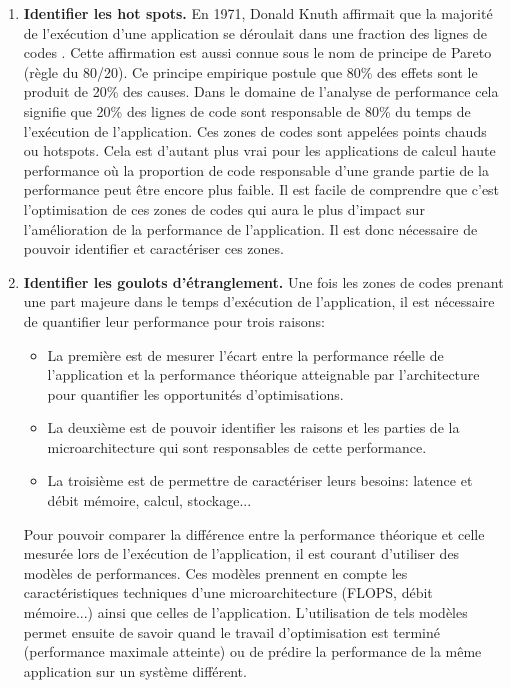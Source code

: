         \begin{enumerate}
            
            \item \textbf{Identifier les hot spots.} En 1971, Donald Knuth affirmait que la majorité de l’exécution d'une application se déroulait dans une fraction des lignes de codes \cite{knuth1971empirical}. Cette affirmation est aussi connue sous le nom de principe de Pareto  (règle du 80/20). Ce principe empirique postule que 80\% des effets sont le produit de 20\% des causes. Dans le domaine de l’analyse de performance cela signifie que 20\% des lignes de code sont responsable de 80\% du temps de l'exécution de l'application. Ces zones de codes sont appelées points chauds ou \glspl{hotspot}. Cela est d’autant plus vrai pour les applications de calcul haute performance où la proportion de code responsable d'une grande partie de la performance peut être encore plus faible. Il est facile de comprendre que c'est l'optimisation de ces zones de codes qui aura le plus d'impact sur l'amélioration de la performance de l'application. Il est donc nécessaire de pouvoir identifier et caractériser ces zones.
            
            \item \textbf{Identifier les goulots d'étranglement.} Une fois les zones de codes prenant une part majeure dans le temps d'exécution de l'application, il est nécessaire de quantifier leur performance pour trois raisons: 
            \begin{itemize}
                \item La première est de mesurer l'écart entre la performance réelle de l'application et la performance théorique atteignable par l'architecture pour quantifier les opportunités d'optimisations. 
                \item La deuxième est de pouvoir identifier les raisons et les parties de la microarchitecture qui sont responsables de cette performance. 
                \item La troisième est de permettre de caractériser leurs besoins: latence et débit mémoire, calcul, stockage...
            \end{itemize}
            Pour pouvoir comparer la différence entre la performance théorique et celle mesurée lors de l'exécution de l'application, il est courant d'utiliser des modèles de performances. Ces modèles prennent en compte les caractéristiques techniques d'une microarchitecture (FLOPS, débit mémoire...) ainsi que celles de l'application. L'utilisation de tels modèles permet ensuite de savoir quand le travail d'optimisation est terminé (performance maximale atteinte) ou de prédire la performance de la même application sur un système différent.
        \end{enumerate}
        
